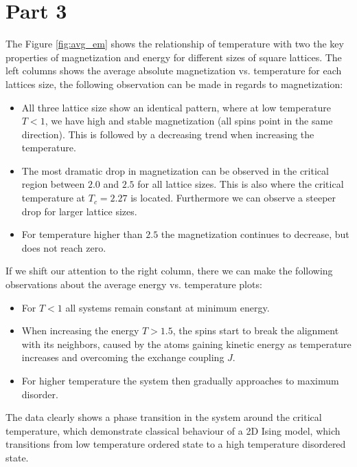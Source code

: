 \section*{Part 3}
The Figure \ref{fig:avg_em} shows the relationship of temperature with two the key properties of magnetization and energy for different sizes of square lattices.
The left columns shows the average absolute magnetization vs. temperature for each lattices size, the following observation can be made in regards to magnetization:
\begin{itemize}
	\item All three lattice size show an identical pattern, where at low temperature $T < 1$, we have high and stable magnetization (all spins point in the same direction). This is followed by a decreasing trend when increasing the temperature.
	\item The most dramatic drop in magnetization can be observed in the critical region between $2.0$ and $2.5$ for all lattice sizes. This is also where the critical temperature at $T_c = 2.27$ is located. Furthermore we can observe a steeper drop for larger lattice sizes.
	\item For temperature higher than $2.5$ the magnetization continues to decrease, but does not reach zero.
\end{itemize}
If we shift our attention to the right column, there we can make the following observations about the average energy vs. temperature plots:
\begin{itemize}
	\item For $T < 1$ all systems remain constant at minimum energy.
	\item When increasing the energy $T > 1.5$, the spins start to break the alignment with its neighbors, caused by the atoms gaining kinetic energy as temperature increases and overcoming the exchange coupling $J$.
	\item For higher temperature the system then gradually approaches to maximum disorder.
\end{itemize}
The data clearly shows a phase transition in the system around the critical temperature, which demonstrate classical behaviour of a 2D Ising model, which transitions from low temperature ordered state to a high temperature disordered state.
